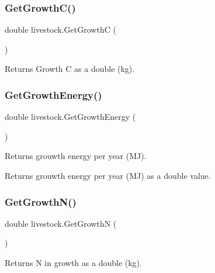 \subsubsection{\texorpdfstring{GetGrowthC()}{GetGrowthC()}}
{\footnotesize\ttfamily double livestock.\+Get\+GrowthC (\begin{DoxyParamCaption}{ }\end{DoxyParamCaption})\hspace{0.3cm}{\ttfamily [inline]}}



Returns Growth C as a double (kg). 

\mbox{\label{classlivestock_a4a18f5cfcedb2990257d0f50a0440bd8}} 
\subsubsection{\texorpdfstring{GetGrowthEnergy()}{GetGrowthEnergy()}}
{\footnotesize\ttfamily double livestock.\+Get\+Growth\+Energy (\begin{DoxyParamCaption}{ }\end{DoxyParamCaption})\hspace{0.3cm}{\ttfamily [inline]}}



Returns grouwth energy per year (MJ). 

\begin{DoxyReturn}{Returns}
grouwth energy per year (MJ) as a double value. 
\end{DoxyReturn}
\mbox{\label{classlivestock_a658e5f0abf42c7fa7526c977c42e1e55}} 
\subsubsection{\texorpdfstring{GetGrowthN()}{GetGrowthN()}}
{\footnotesize\ttfamily double livestock.\+Get\+GrowthN (\begin{DoxyParamCaption}{ }\end{DoxyParamCaption})\hspace{0.3cm}{\ttfamily [inline]}}



Returns N in growth as a double (kg). 

